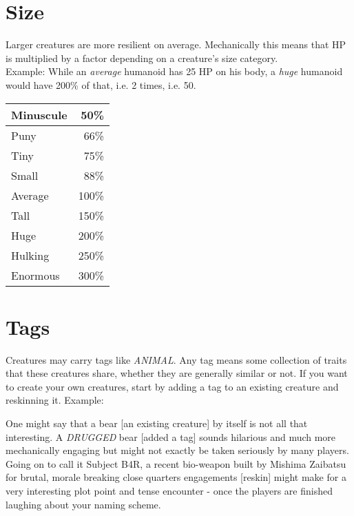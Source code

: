\documentclass[12pt,a4paper,openany]{book}
\begin{document}
	\section{Size}
	Larger creatures are more resilient on average. Mechanically this means that HP is multiplied by a factor depending on a creature's size category.\\
	Example: While an \emph{average} humanoid has 25 HP on his body, a \emph{huge} humanoid would have 200\% of that, i.e. 2 times, i.e. 50.\\
	\begin{center}
	\begin{tabular}{|l|r|}
		\hline
		Minuscule &  50\% \\ \hline
		Puny      &  66\% \\ \hline
		Tiny      &  75\% \\ \hline
		Small     &  88\% \\ \hline
		Average   & 100\% \\ \hline
		Tall      & 150\% \\ \hline
		Huge      & 200\% \\ \hline
		Hulking   & 250\% \\ \hline
		Enormous  & 300\% \\ \hline
	\end{tabular}
	\end{center}

	\section{Tags}
	Creatures may carry tags like \emph{ANIMAL}. Any tag means some collection of traits that these creatures share, whether they are generally similar or not. If you want to create your own creatures, start by adding a tag to an existing creature and reskinning it. Example:\par
	\begin{exampleblock}
		One might say that a bear [an existing creature] by itself is not all that interesting. A \emph{DRUGGED} bear [added a tag] sounds hilarious and much more mechanically engaging but might not exactly be taken seriously by many players.\\
		Going on to call it Subject B4R, a recent bio-weapon built by Mishima Zaibatsu for brutal, morale breaking close quarters engagements [reskin] might make for a very interesting plot point and tense encounter - once the players are finished laughing about your naming scheme.
	\end{exampleblock}
	
\end{document}
